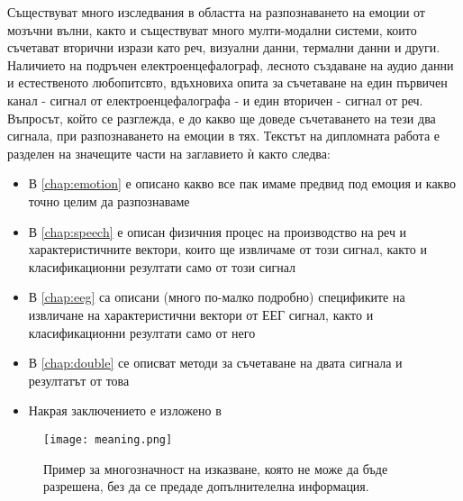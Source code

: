 \documentclass[main.tex]{subfiles}
\begin{document}
Съществуват много изследвания в областта на разпознаването на емоции от мозъчни вълни, както и съществуват много мулти-модални системи, които съчетават вторични изрази като реч, визуални данни, термални данни и други. Наличието на подръчен електроенцефалограф, лесното създаване на аудио данни и естественото любопитсвто, вдъхновиха опита за съчетаване на един първичен канал - сигнал от електроенцефалографа - и един вторичен - сигнал от реч. Въпросът, който се разглежда, е до какво ще доведе съчетаването на тези два сигнала, при разпознаването на емоции в тях. Текстът на дипломната работа е разделен на значещите части на заглавието ѝ както следва:
\begin{itemize}
    \item В \autoref{chap:emotion} е описано какво все пак имаме предвид под емоция и какво точно целим да разпознаваме
    \item В \autoref{chap:speech} е описан физичния процес на производство на реч и характеристичните вектори, които ще извличаме от този сигнал, както и класификационни резултати само от този сигнал
    \item В \autoref{chap:eeg} са описани (много по-малко подробно) спецификите на извличане на характеристични вектори от ЕЕГ сигнал, както и класификационни резултати само от него
    \item В \autoref{chap:double} се описват методи за съчетаване на двата сигнала и резултатът от това
    \item Накрая заключението е изложено в  
\end{itemize}

\begin{center}
\begin{figure}[ht]%
        \texttt{[image: meaning.png]}%
        \caption{Пример за многозначност на изказване, която не може да бъде разрешена, без да се предаде допълнителелна информация.}%
        \label{fig:intro:1}
    \end{figure}
\end{center}
\end{document}
